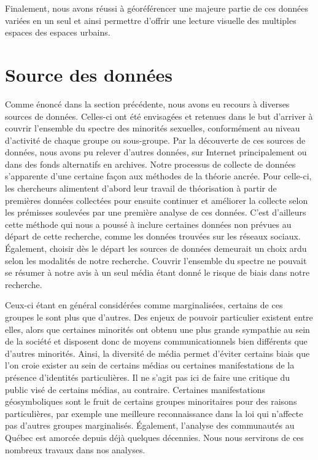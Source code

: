 Finalement, nous avons réussi à géoréférencer une majeure partie de ces données variées en un seul \sig{} et ainsi permettre d'offrir une lecture visuelle des multiples espaces \qus{} des espaces urbains.

\section{Source des données}
\label{sec:source_des_donn_es}
Comme énoncé dans la section précédente, nous avons eu recours à diverses sources de données. 
Celles-ci ont été envisagées et retenues dans le but d'arriver à couvrir l'ensemble du spectre des minorités sexuelles, conformément au niveau d'activité de chaque groupe ou sous-groupe. 
Par la découverte de ces sources de données, nous avons pu relever d'autres données, sur Internet principalement ou dans des fonds alternatifs en archives. 
Notre processus de collecte de données s'apparente d'une certaine façon aux méthodes de la théorie ancrée.
Pour celle-ci, les chercheurs alimentent d'abord leur travail de théorisation à partir de premières données collectées pour ensuite continuer et améliorer la collecte selon les prémisses soulevées par une première analyse de ces données. 
C'est d'ailleurs cette méthode qui nous a poussé à inclure certaines données non prévues au départ de cette recherche, comme les données trouvées sur les réseaux sociaux. 
Également, choisir dès le départ les sources de données demeurait un choix ardu selon les modalités de notre recherche. 
Couvrir l'ensemble du spectre \lgbt{} ne pouvait se résumer à notre avis à un seul média étant donné le risque de biais dans notre recherche.

Ceux-ci étant en général considérées comme marginalisées, certains de ces groupes le sont plus que d'autres. 
Des enjeux de pouvoir particulier existent entre elles, alors que certaines minorités ont obtenu une plus grande sympathie au sein de la société et disposent donc de moyens communicationnels bien différents que d'autres minorités. 
Ainsi, la diversité de média permet d'éviter certains biais que l'on croie exister au sein de certains médias ou certaines manifestations de la présence d'identités particulières. 
Il ne s'agit pas ici de faire une critique du public visé de certains médias, au contraire. 
Certaines manifestations géosymboliques sont le fruit de certains groupes minoritaires pour des raisons particulières, par exemple une meilleure reconnaissance dans la loi qui n'affecte pas d'autres groupes marginalisés. 
Également, l'analyse des communautés \lgbt{} au Québec est amorcée depuis déjà quelques décennies. 
Nous nous servirons de ces nombreux travaux dans nos analyses.

